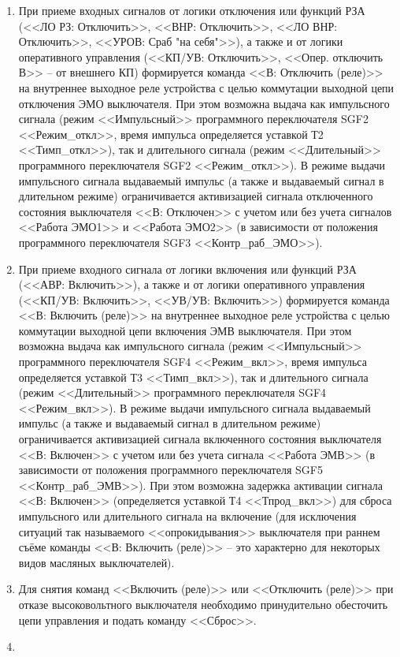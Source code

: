 \begin{enumerate}
{\begin{enumerate}
\item
При приеме входных сигналов от логики отключения или функций РЗА (<<ЛО РЗ: Отключить>>, <<ВНР: Отключить>>, <<ЛО ВНР: Отключить>>, <<УРОВ: Сраб "на себя">>), а также и от логики оперативного управления (<<КП/УВ: Отключить>>, <<Опер. отключить В>> -- от внешнего КП) формируется команда <<В: Отключить (реле)>> на внутреннее выходное реле устройства с целью коммутации выходной цепи отключения ЭМО выключателя. При этом возможна выдача как импульсного сигнала (режим <<Импульсный>> программного переключателя SGF2 <<Режим\_откл>>, время импульса определяется уставкой Т2 <<Тимп\_откл>>), так и длительного сигнала (режим <<Длительный>> программного переключателя SGF2 <<Режим\_откл>>). 
В режиме выдачи импульсного сигнала выдаваемый импульс (а также и выдаваемый сигнал в длительном режиме) ограничивается активизацией сигнала отключенного состояния выключателя <<В: Отключен>> с учетом или без учета сигналов <<Работа ЭМО1>> и <<Работа ЭМО2>> (в зависимости от положения программного переключателя SGF3 <<Контр\_раб\_ЭМО>>).
\item
При приеме входного сигнала от логики включения или функций РЗА (<<АВР: Включить>>), а также и от логики оперативного управления (<<КП/УВ: Включить>>, <<УВ/УВ: Включить>>) формируется команда <<В: Включить (реле)>> на внутреннее выходное реле устройства с целью коммутации выходной цепи включения ЭМВ выключателя. При этом возможна выдача как импульсного сигнала (режим <<Импульсный>> программного переключателя SGF4 <<Режим\_вкл>>, время импульса определяется уставкой Т3 <<Тимп\_вкл>>), так и длительного сигнала (режим <<Длительный>> программного переключателя SGF4 <<Режим\_вкл>>).
В режиме выдачи импульсного сигнала выдаваемый импульс (а также и выдаваемый сигнал в длительном режиме) ограничивается активизацией сигнала включенного состояния выключателя <<В: Включен>> с учетом или без учета сигнала <<Работа ЭМВ>> (в зависимости от положения программного переключателя SGF5 <<Контр\_раб\_ЭМВ>>). При этом возможна задержка активации сигнала <<В: Включен>> (определяется уставкой Т4 <<Тпрод\_вкл>>) для сброса импульсного или длительного сигнала на включение (для исключения ситуаций так называемого <<опрокидывания>> выключателя при раннем съёме команды <<В: Включить (реле)>> -- это характерно для некоторых видов масляных выключателей).
\item
Для снятия команд <<Включить (реле)>> или <<Отключить (реле)>> при отказе высоковольтного выключателя необходимо принудительно обесточить цепи управления и подать команду <<Сброс>>.
\item

\end{enumerate}}
\end{enumerate}
